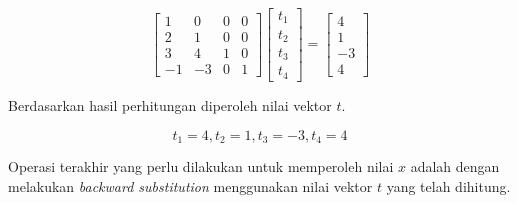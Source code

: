 \documentclass[]{book}
\theoremstyle{definition}
\theoremstyle{definition}
\theoremstyle{definition}
\theoremstyle{remark}
\begin{document}
\begin{equation*}
\begin{bmatrix}
      1         & 0       & 0       & 0           \\[0.3em]
      2         & 1       & 0       & 0           \\[0.3em]
      3         & 4       & 1       & 0           \\[0.3em]
      -1        & -3      & 0       & 1
     \end{bmatrix}
\begin{bmatrix}
     t_1                                          \\[0.3em]
     t_2                                          \\[0.3em]
     t_3                                          \\[0.3em]
     t_4                                       
     \end{bmatrix}
= \begin{bmatrix}
     4                                          \\[0.3em]
     1                                          \\[0.3em]
     -3                                          \\[0.3em]
     4                                       
     \end{bmatrix}
\end{equation*}

Berdasarkan hasil perhitungan diperoleh nilai vektor \(t\).

\[
t_1=4, t_2=1, t_3=-3, t_4=4
\]

Operasi terakhir yang perlu dilakukan untuk memperoleh nilai \(x\) adalah dengan melakukan \emph{backward substitution} menggunakan nilai vektor \(t\) yang telah dihitung.
\end{document}
